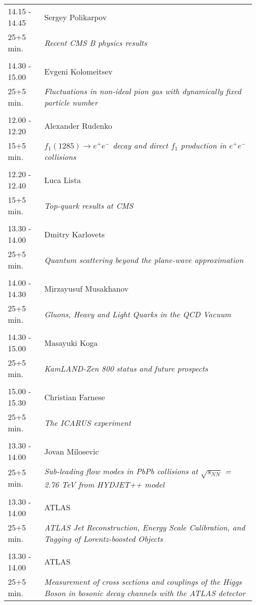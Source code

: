 \begin{longtable}{p{3cm}p{13cm}}
14.15 - 14.45 & Sergey Polikarpov\\ 
25+5 min. & {\it Recent CMS B physics results}\\ 
 & \\ 
14.30 - 15.00 & Evgeni Kolomeitsev\\ 
25+5 min. & {\it Fluctuations in non-ideal pion gas with dynamically fixed particle number}\\ 
 & \\ 
12.00 - 12.20 & Alexander Rudenko\\ 
15+5 min. & {\it $f_1 (1285) \to e^+e^-$ decay and direct $f_1$ production in $e^+e^-$ collisions}\\ 
 & \\ 
12.20 - 12.40 & Luca Lista\\ 
15+5 min. & {\it Top-quark results at CMS}\\ 
 & \\ 
13.30 - 14.00 & Dmitry Karlovets\\ 
25+5 min. & {\it Quantum scattering beyond the plane-wave approximation}\\ 
 & \\ 
14.00 - 14.30 & Mirzayusuf Musakhanov\\ 
25+5 min. & {\it Gluons, Heavy and Light Quarks in the QCD Vacuum}\\ 
 & \\ 
14.30 - 15.00 & Masayuki Koga\\ 
25+5 min. & {\it KamLAND-Zen 800 status and future prospects}\\ 
 & \\ 
15.00 - 15.30 & Christian Farnese\\ 
25+5 min. & {\it The ICARUS experiment}\\ 
 & \\ 
13.30 - 14.00 & Jovan Milosevic\\ 
25+5 min. & {\it Sub-leading flow modes in PbPb collisions at $\sqrt{s_{NN}}$ = 2.76 TeV from HYDJET++ model}\\ 
 & \\ 
13.30 - 14.00 & ATLAS\\ 
25+5 min. & {\it ATLAS Jet Reconstruction, Energy Scale Calibration, and Tagging of Lorentz-boosted Objects}\\ 
 & \\ 
13.30 - 14.00 & ATLAS\\ 
25+5 min. & {\it Measurement of cross sections and couplings of the Higgs Boson in bosonic decay channels with the ATLAS detector}\\ 

\end{longtable}
